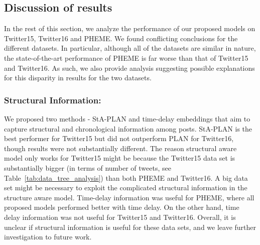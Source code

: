 \documentclass[letterpaper]{article} %
\begin{document}
\subsection{Discussion of results} \label{Results Analysis}
In the rest of this section, we analyze the performance of our proposed models on Twitter15, Twitter16 and PHEME. We found conflicting conclusions for the different datasets. In particular, although all of the datasets are similar in nature, the state-of-the-art performance of PHEME is far worse than that of Twitter15 and Twitter16. As such, we also provide analysis suggesting possible explanations for this disparity in results for the two datasets.

\subsubsection{Structural Information:} 
We proposed two methods - StA-PLAN and time-delay embeddings that aim to capture structural and chronological information among posts. StA-PLAN is the best performer for Twitter15 but did not outperform PLAN for Twitter16, though results were not substantially different. The reason structural aware model only works for Twitter15 might be because the Twitter15 data set is substantially bigger (in terms of number of tweets, see Table~\ref{tab:data_tree_analysis}) than both PHEME and Twitter16. A big data set might be necessary to exploit the complicated structural information in the structure aware model. Time-delay information was useful for PHEME, where all proposed models performed better with time delay. On the other hand, time delay information was not useful for Twitter15 and Twitter16. Overall, it is unclear if structural information is useful for these data sets, and we leave further investigation to future work.
\end{document}

